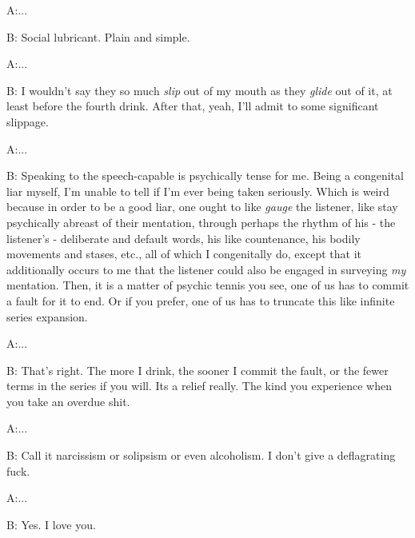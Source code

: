 \documentclass{article}
\begin{document}
A:...

B: Social lubricant. Plain and simple.

A:...

B: I wouldn't say they so much \textit{slip} out of my mouth as they
\textit{glide} out of it, at least before the fourth drink. After that,
yeah, I'll admit to some significant slippage.

A:...

B: Speaking to the speech-capable is psychically tense for me. Being
a congenital liar myself, I'm unable to tell if I'm ever being taken
seriously. Which is weird because in order to be a good liar, one ought
to like \textit{gauge} the listener, like stay psychically abreast of
their mentation, through perhaps the rhythm of his - the listener's
- deliberate and default words, his like countenance, his bodily
movements and stases, etc., all of which I congenitally do, except that
it additionally occurs to me that the listener could also be engaged in
surveying \textit{my} mentation. Then, it is a matter of psychic tennis
you see, one of us has to commit a fault for it to end. Or if you
prefer, one of us has to truncate this like infinite series expansion. 

A:...

B: That's right. The more I drink, the sooner I commit the fault, or the
fewer terms in the series if you will. Its a relief really. The kind
you experience when you take an overdue shit.

A:...

B: Call it narcissism or solipsism or even alcoholism. I don't give
a deflagrating fuck.

A:...

B: Yes. I love you.
\end{document}

